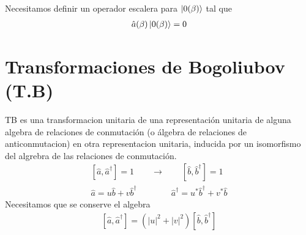 \documentclass{article}
\begin{document}
\hfill 

\hfill 

Necesitamos definir un operador escalera para $ \ket{0(\beta)} $ tal que 
\begin{gather*}
  \hat a(\beta) \ket{0 (\beta)} = 0 
\end{gather*}




\section{Transformaciones de Bogoliubov (T.B)}
TB es una transformacion unitaria de una representación unitaria de alguna algebra de relaciones de conmutación (o álgebra de relaciones de anticonmutacion) en otra representacion unitaria, inducida por un isomorfismo del algrebra de las relaciones de conmutación.
\begin{gather*}
  \left[ \hat a  , \hat a ^ {\dagger }  \right] = 1 \qquad \rightarrow \qquad \left[ \hat b  ,  \hat b ^ {\dagger }  \right] = 1 \\
  \hat a = u \hat b + v \hat b ^ {\dagger } \qquad \qquad \hat a ^ {\dagger } = u^* \hat b ^ {\dagger } + v^* \hat b 
\end{gather*}
Necesitamos que se conserve el algebra 
\begin{gather*}
  \left[ \hat a  , \hat a ^ {\dagger }  \right] = (\left|u \right|^2 + \left|v \right|^2) \left[ \hat b  , \hat b ^ {\dagger }  \right] 
\end{gather*}
\end{document}
